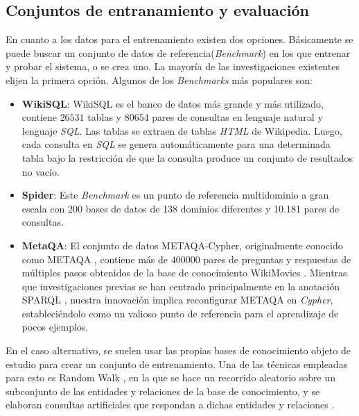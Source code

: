 \subsection{Conjuntos de entranamiento y evaluación} \label{neurosymbolic_approach_bechmarks}

En cuanto a los datos para el entrenamiento existen dos opciones. Básicamente se puede buscar un conjunto de datos de referencia(\textit{Benchmark}) en los que entrenar y probar el sistema, o se crea uno. La mayoría de las investigaciones existentes elijen la primera opción. Algunos de los \textit{Benchmarks} más populares son:

\begin{itemize}
	\item \textbf{WikiSQL}: WikiSQL \cite{wikisql} es el banco de datos más grande y más utilizado, contiene $26531$ tablas y $80654$ pares de consultas en lenguaje natural y lenguaje \textit{SQL}. Las tablas se extraen de tablas \textit{HTML} de Wikipedia. Luego, cada consulta en \textit{SQL} se genera automáticamente para una determinada tabla bajo la restricción de que la consulta produce un conjunto de resultados no vacío.

	\item \textbf{Spider}:	 Este \textit{Benchmark} \cite{spiderdataset} es un punto de referencia multidominio a gran escala con 200 bases de datos de 138 dominios diferentes y 10.181 pares de consultas.

	\item \textbf{MetaQA}: El conjunto de datos METAQA-Cypher, originalmente conocido como METAQA \cite{zhangetal2018}, contiene más de $400000$ pares de preguntas y respuestas de múltiples pasos obtenidos de la base de conocimiento WikiMovies \cite{milleretal2016}. Mientras que investigaciones previas se han centrado principalmente en la anotación SPARQL \cite{huangetal2021}, nuestra innovación implica reconfigurar METAQA en \textit{Cypher}, estableciéndolo como un valioso punto de referencia para el aprendizaje de pocos ejemplos.

\end{itemize}

En el caso alternativo, se suelen usar las propias bases de conocimiento objeto de
estudio para crear un conjunto de entrenamiento. Una de las técnicas empleadas para
esto es Random Walk \cite{randomwalk}, en la que se hace un recorrido aleatorio sobre un subconjunto de las entidades y relaciones de la base de conocimiento, y se elaboran consultas artificiales que respondan a dichas entidades y relaciones \cite{dominikopitz2022}.

